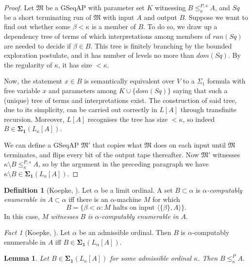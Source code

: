 \documentclass[12pt, twoside]{memoir}
\numberwithin{equation}{section}
\newtheorem{lem}[thm]{Lemma}
\theoremstyle{definition}
\newtheorem{defi}[thm]{Definition}
\theoremstyle{remark}
\newtheorem{fact}[thm]{Fact}
\theoremstyle{definition}
\theoremstyle{definition}
\theoremstyle{definition}
\theoremstyle{remark}
\begin{document}
\begin{proof}
Let $\mathfrak{M}$ be a GSeqAP with parameter set $K$ witnessing $B \leq^{P, s}_{\kappa} A$, and $Sq$ be a short terminating run of $\mathfrak{M}$ with input $A$ and output $B$. Suppose we want to find out whether some $\beta < \kappa$ is a member of $B$. To do so, we draw up a dependency tree of terms of which interpretations among members of $ran(Sq)$ are needed to decide if $\beta \in B$. This tree is finitely branching by the bounded exploration postulate, and it has number of levels no more than $dom(Sq)$. By the regularity of $\kappa$, it has size $< \kappa$. 

Now, the statement $x \in B$ is semantically equivalent over $V$ to a $\Sigma_1$ formula with free variable $x$ and parameters among $K \cup \{dom(Sq)\}$ saying that such a (unique) tree of terms and interpretations exist. The construction of said tree, due to its simplicity, can be carried out correctly in $L[A]$ through transfinite recursion. Moreover, $L[A]$ recognises the tree has size $< \kappa$, so indeed $B \in \mathbf{\Sigma_1}(L_{\kappa}[A])$.

We can define a GSeqAP $\mathfrak{M}'$ that copies what $\mathfrak{M}$ does on each input until $\mathfrak{M}$ terminates, and flips every bit of the output tape thereafter. Now $\mathfrak{M}'$ witnesses $\kappa \setminus B \leq^{P, s}_{\kappa} A$, so by the argument in the preceding paragraph we have $\kappa \setminus B \in \mathbf{\Sigma_1}(L_{\kappa}[A])$.
\end{proof}

\begin{defi}[Koepke, \cite{koepke2}]
Let $\alpha$ be a limit ordinal. A set $B \subset \alpha$ is $\alpha$\emph{-computably enumerable in} $A \subset \alpha$ iff there is an $\alpha$-machine $M$ for which
\begin{equation*}
    B = \{\beta < \alpha : M \text{ halts on input } \langle \{\beta\}, A \rangle\} \text{.}
\end{equation*}
In this case, $M$ \emph{witnesses} $B$ \emph{is} $\alpha$\emph{-computably enumerable in} $A$.
\end{defi}

\begin{fact}[Koepke, \cite{koepke2}]\label{fact272}
Let $\alpha$ be an admissible ordinal. Then $B$ is $\alpha$-computably enumerable in $A$ iff $B \in \mathbf{\Sigma_1}(L_{\alpha}[A])$.
\end{fact}

\begin{lem}\label{lem273}
Let $B \in \mathbf{\Sigma_1}(L_{\kappa}[A])$ for some admissible ordinal $\kappa$. Then $B \leq^P_{\kappa} A$.
\end{lem}
\end{document}
